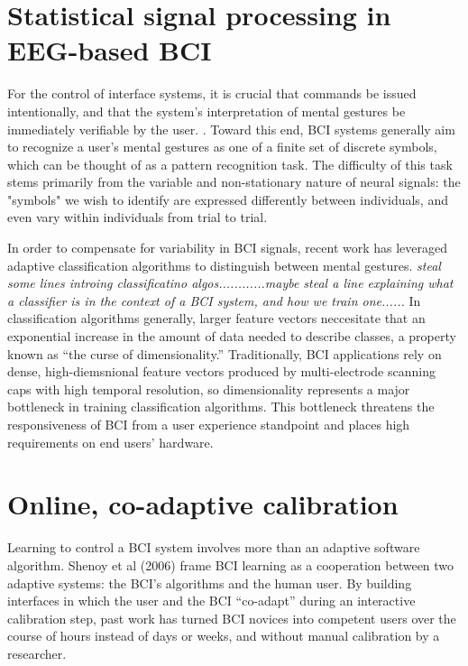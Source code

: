 \section{Statistical signal processing in EEG-based BCI}

For the control of interface systems, it is crucial that commands be issued intentionally, and that the system's interpretation of mental gestures be immediately verifiable by the user. \cite{millan_combining_2010,ali_empirical_2014}. Toward this end, BCI systems generally aim to recognize a user's mental gestures as one of a finite set of discrete symbols, which can be thought of as a pattern recognition task. \cite{lotte_review_2007} The difficulty of this task stems primarily from the variable and non-stationary nature of neural signals: the "symbols" we wish to identify are expressed differently between individuals, and even vary within individuals from trial to trial. \cite{vidaurre_fully_2006,vidaurre_machine-learning-based_2011} 

In order to compensate for variability in BCI signals, recent work has leveraged adaptive classification algorithms to distinguish between mental gestures. \cite{lotte_review_2007,vidaurre_machine-learning-based_2011} \textit{steal some lines introing classificatino algos............maybe steal a line explaining what a classifier is in the context of a BCI system, and how we train one......} In classification algorithms generally, larger feature vectors neccesitate that an exponential increase in the amount of data needed to describe classes, a property known as ``the curse of dimensionality.'' \cite{jain_statistical_2000,raudys_small_1991} Traditionally, BCI applications rely on dense, high-diemsnional feature vectors produced by multi-electrode scanning caps with high temporal resolution, so dimensionality represents a major bottleneck in training classification algorithms. This bottleneck threatens the responsiveness of BCI from a user experience standpoint and places high requirements on end users' hardware.

\section{Online, co-adaptive calibration}

Learning to control a BCI system involves more than an adaptive software algorithm. Shenoy et al (2006) frame BCI learning as a cooperation between two adaptive systems: the BCI's algorithms and the human user. \cite{shenoy_towards_2006} By building interfaces in which the user and the BCI ``co-adapt'' during an interactive calibration step, past work has turned BCI novices into competent users over the course of hours instead of days or weeks, and without manual calibration by a researcher. \cite{vidaurre_fully_2006,vidaurre_co-adaptive_2011,vidaurre_machine-learning-based_2011}

